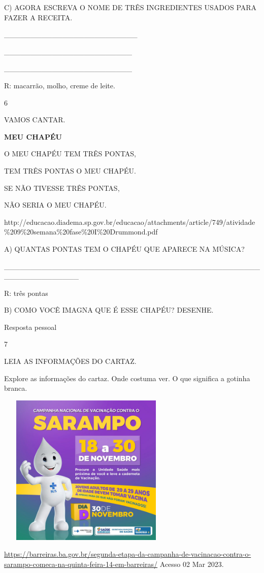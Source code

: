 {{C) AGORA ESCREVA O NOME DE TRÊS INGREDIENTES USADOS PARA FAZER A
RECEITA.

\_\_\_\_\_\_\_\_\_\_\_\_\_\_\_\_\_\_\_\_\_\_\_\_\_

\_\_\_\_\_\_\_\_\_\_\_\_\_\_\_\_\_\_\_\_\_\_\_\_

\_\_\_\_\_\_\_\_\_\_\_\_\_\_\_\_\_\_\_\_\_\_\_\_

R: macarrão, molho, creme de leite.

\num{6}

VAMOS CANTAR.

\textbf{MEU CHAPÉU}

O MEU CHAPÉU TEM TRÊS PONTAS,

TEM TRÊS PONTAS O MEU CHAPÉU.

SE NÃO TIVESSE TRÊS PONTAS,

NÃO SERIA O MEU CHAPÉU.

http://educacao.diadema.sp.gov.br/educacao/attachments/article/749/atividade\%209\%20semana\%20fase\%20I\%20Drummond.pdf

A) QUANTAS PONTAS TEM O CHAPÉU QUE APARECE NA MÚSICA?

\_\_\_\_\_\_\_\_\_\_\_\_\_\_\_\_\_\_\_\_\_\_\_\_\_\_\_\_\_\_\_\_\_\_\_\_\_\_\_\_\_\_\_\_\_\_\_\_\_\_\_\_\_\_\_\_\_\_\_\_\_\_

R: três pontas

B) COMO VOCÊ IMAGNA QUE É ESSE CHAPÉU? DESENHE.

Resposta pessoal

\num{7}

LEIA AS INFORMAÇÕES DO CARTAZ.

Explore as informações do cartaz. Onde costuma ver. O que significa a
gotinha branca.

\includegraphics[width=3.36943in,height=2.86363in]{media/image85.jpeg}

\url{https://barreiras.ba.gov.br/segunda-etapa-da-campanha-de-vacinacao-contra-o-sarampo-comeca-na-quinta-feira-14-em-barreiras/}
Acesso 02 Mar 2023.

}}
